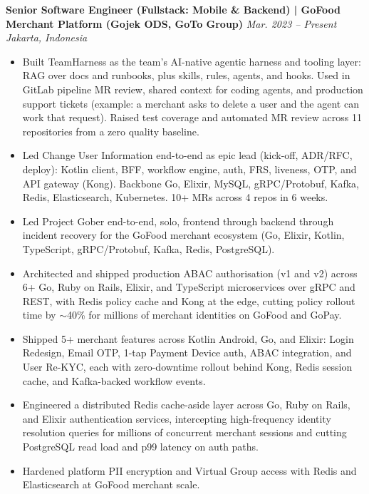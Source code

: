 \documentclass[10pt]{article}
\begin{document}
{\textbf{Senior Software Engineer (Fullstack: Mobile \& Backend) | GoFood Merchant Platform (Gojek ODS, GoTo Group)} \hfill \textit{Mar. 2023 -- Present}\\
\textit{Jakarta, Indonesia}
\begin{itemize}
\item Built TeamHarness as the team's AI-native agentic harness and tooling layer: RAG over docs and runbooks, plus skills, rules, agents, and hooks. Used in GitLab pipeline MR review, shared context for coding agents, and production support tickets (example: a merchant asks to delete a user and the agent can work that request). Raised test coverage and automated MR review across 11 repositories from a zero quality baseline.
\item Led Change User Information end-to-end as epic lead (kick-off, ADR/RFC, deploy): Kotlin client, BFF, workflow engine, auth, FRS, liveness, OTP, and API gateway (Kong). Backbone Go, Elixir, MySQL, gRPC/Protobuf, Kafka, Redis, Elasticsearch, Kubernetes. 10+ MRs across 4 repos in 6 weeks.
\item Led Project Gober end-to-end, solo, frontend through backend through incident recovery for the GoFood merchant ecosystem (Go, Elixir, Kotlin, TypeScript, gRPC/Protobuf, Kafka, Redis, PostgreSQL).
\item Architected and shipped production ABAC authorisation (v1 and v2) across 6+ Go, Ruby on Rails, Elixir, and TypeScript microservices over gRPC and REST, with Redis policy cache and Kong at the edge, cutting policy rollout time by $\sim$40\% for millions of merchant identities on GoFood and GoPay.
\item Shipped 5+ merchant features across Kotlin Android, Go, and Elixir: Login Redesign, Email OTP, 1-tap Payment Device auth, ABAC integration, and User Re-KYC, each with zero-downtime rollout behind Kong, Redis session cache, and Kafka-backed workflow events.
\item Engineered a distributed Redis cache-aside layer across Go, Ruby on Rails, and Elixir authentication services, intercepting high-frequency identity resolution queries for millions of concurrent merchant sessions and cutting PostgreSQL read load and p99 latency on auth paths.
\item Hardened platform PII encryption and Virtual Group access with Redis and Elasticsearch at GoFood merchant scale.
\end{itemize}

}
\end{document}
